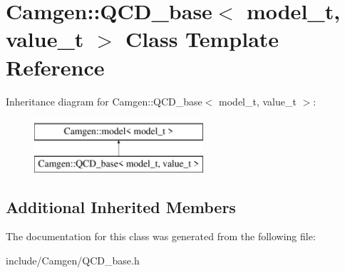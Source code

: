 \hypertarget{a00450}{\section{Camgen\-:\-:Q\-C\-D\-\_\-base$<$ model\-\_\-t, value\-\_\-t $>$ Class Template Reference}
\label{a00450}
}
Inheritance diagram for Camgen\-:\-:Q\-C\-D\-\_\-base$<$ model\-\_\-t, value\-\_\-t $>$\-:\begin{figure}[H]
\begin{center}
\leavevmode
\includegraphics[height=2.000000cm]{a00450}
\end{center}
\end{figure}
\subsection*{Additional Inherited Members}


The documentation for this class was generated from the following file\-:\begin{DoxyCompactItemize}
\item 
include/\-Camgen/Q\-C\-D\-\_\-base.\-h\end{DoxyCompactItemize}

